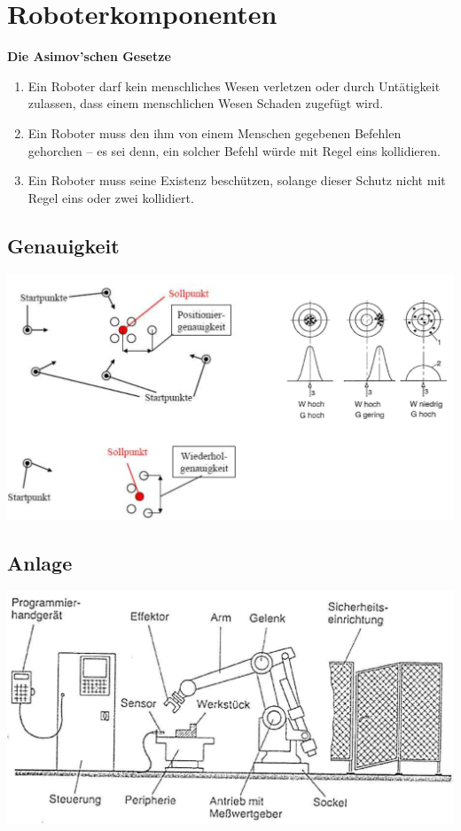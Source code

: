 \section{Roboterkomponenten}
\textbf{Die Asimov’schen Gesetze}\newline
\begin{enumerate}
    \item Ein Roboter darf kein menschliches Wesen verletzen oder durch Untätigkeit zulassen, dass einem menschlichen Wesen Schaden zugefügt wird.
    \item Ein Roboter muss den ihm von einem Menschen gegebenen Befehlen gehorchen – es sei denn, ein solcher Befehl würde mit Regel eins kollidieren.
    \item Ein Roboter muss seine Existenz beschützen, solange dieser Schutz nicht mit Regel eins oder zwei kollidiert.
\end{enumerate}
\begin{minipage}{0.5\linewidth}
\subsection{Genauigkeit}
\includegraphics[width=\linewidth]{./bilder/genauigkeit}
\subsection{Anlage}
\includegraphics[width=\linewidth]{./bilder/anlage}
\end{minipage}
